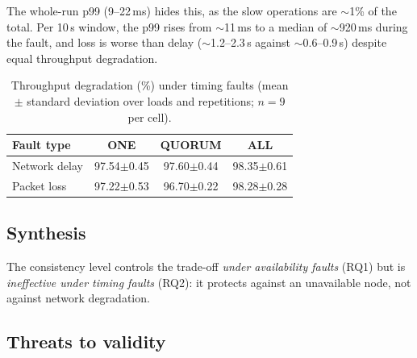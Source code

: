 \documentclass[runningheads]{llncs}
\begin{document}
The whole-run p99 (9--22\,ms) hides this, as the slow operations are $\sim$1\%
of the total. Per 10\,s window, the p99 rises from $\sim$11\,ms to a median of
$\sim$920\,ms during the fault, and loss is worse than delay ($\sim$1.2--2.3\,s
against $\sim$0.6--0.9\,s) despite equal throughput degradation.

\begin{table}[t]
\centering
\caption{Throughput degradation (\%) under timing faults (mean $\pm$ standard
deviation over loads and repetitions; $n=9$ per cell).}
\label{tab:performability}
\small
\setlength{\tabcolsep}{5pt}
\begin{tabular}{lccc}
\toprule
\textbf{Fault type} & \textbf{ONE} & \textbf{QUORUM} & \textbf{ALL} \\
\midrule
Network delay & 97.54$\pm$0.45 & 97.60$\pm$0.44 & 98.35$\pm$0.61 \\
Packet loss   & 97.22$\pm$0.53 & 96.70$\pm$0.22 & 98.28$\pm$0.28 \\
\bottomrule
\end{tabular}
\end{table}

\subsection{Synthesis}

The consistency level controls the trade-off \emph{under availability faults}
(RQ1) but is \emph{ineffective under timing faults} (RQ2): it protects against an
unavailable node, not against network degradation.

\subsection{Threats to validity}
\end{document}
